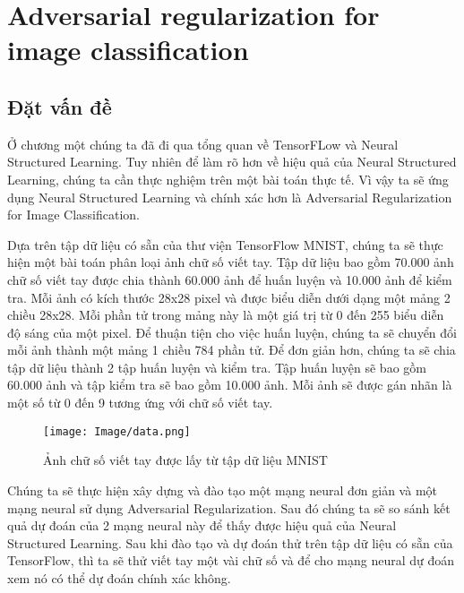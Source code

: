
\chapter{Adversarial regularization for image classification} %

\label{Chapter2} %


\section{Đặt vấn đề}

Ở chương một chúng ta đã đi qua tổng quan về TensorFLow và Neural Structured Learning. Tuy nhiên để làm rõ hơn về hiệu quả của Neural
Structured Learning, chúng ta cần thực nghiệm trên một bài toán thực tế. Vì vậy ta sẽ ứng dụng Neural Structured Learning và chính xác hơn là Adversarial 
Regularization for Image Classification.

Dựa trên tập dữ liệu có sẵn của thư viện TensorFlow MNIST, chúng ta sẽ thực hiện một bài toán phân loại ảnh chữ số viết tay. Tập dữ liệu bao gồm 70.000 ảnh
chữ số viết tay được chia thành 60.000 ảnh để huấn luyện và 10.000 ảnh để kiểm tra. Mỗi ảnh có kích thước 28x28 pixel và được biểu diễn dưới dạng một mảng
2 chiều 28x28. Mỗi phần tử trong mảng này là một giá trị từ 0 đến 255 biểu diễn độ sáng của một pixel. Để thuận tiện cho việc huấn luyện, chúng ta sẽ chuyển đổi
mỗi ảnh thành một mảng 1 chiều 784 phần tử. Để đơn giản hơn, chúng ta sẽ chia tập dữ liệu thành 2 tập huấn luyện và kiểm tra. Tập huấn luyện sẽ bao gồm 60.000 ảnh 
và tập kiểm tra sẽ bao gồm 10.000 ảnh. Mỗi ảnh sẽ được gán nhãn là một số từ 0 đến 9 tương ứng với chữ số viết tay. 

\begin{figure}[h!]
    \centering
    \texttt{[image: Image/data.png]}
    \caption{Ảnh chữ số viết tay được lấy từ tập dữ liệu MNIST}
    \label{Hình 2.1: GẢnh chữ số viết tay được lấy từ tập dữ liệu MNIST}
\end{figure}


Chúng ta sẽ thực hiện xây dựng và đào tạo một mạng neural đơn giản và một mạng neural sử dụng Adversarial Regularization. Sau đó chúng ta sẽ so sánh kết quả 
dự đoán của 2 mạng neural này để thấy được hiệu quả của Neural Structured Learning. Sau khi đào tạo và dự đoán thử trên tập dữ liệu có sẵn của TensorFlow, thì
ta sẽ thử viết tay một vài chữ số và để cho mạng neural dự đoán xem nó có thể dự đoán chính xác không.

